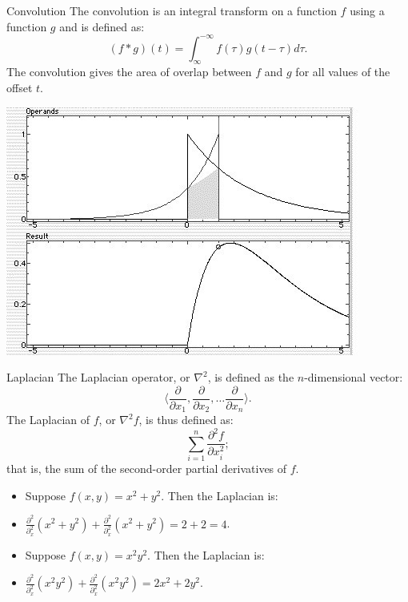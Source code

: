 \documentclass[xcolor=dvipsnames]{beamer}
\begin{document}
\begin{frame}[label=math-convolution]{Convolution}
 The convolution is an integral transform on a function $f$ using a function $g$ and is defined as:
 \begin{equation}
  (f*g)(t) = \int_{\infty}^{-\infty} f(\tau) g(t-\tau) d\tau.
 \end{equation}
 The convolution gives the area of overlap between $f$ and $g$ for all values of the offset $t$.
\end{frame}

\begin{frame}
\includegraphics[width=\textwidth]{imgs/convolution.jpg}
\end{frame}

\begin{frame}[label=math-laplacian]{Laplacian}
 The Laplacian operator, or $\nabla^2$, is defined as the $n$-dimensional vector:
 \begin{equation}
  \langle 
   \frac{\partial}{\partial x_1},
   \frac{\partial}{\partial x_2}, \ldots
   \frac{\partial}{\partial x_n}
  \rangle.
 \end{equation}
 The Laplacian of $f$, or $\nabla^2 f$, is thus defined as:
 \begin{equation}
  \sum_{i=1}^n \frac{\partial^2 f}{\partial x_i^2};
 \end{equation}
 that is, the sum of the second-order partial derivatives of $f$.
\end{frame}

\begin{frame}
 \begin{itemize} 
 \item Suppose $f(x,y) = x^2 + y^2$. Then the Laplacian is:
 \item $\frac{\partial^2}{\partial^2_x} 
       (x^2 + y^2) +
        \frac{\partial^2}{\partial^2_x} 
       (x^2 + y^2) = 2+ 2 = 4$.
 \vspace{16pt}  
 \item Suppose $f(x,y) = x^2y^2$. Then the Laplacian is:
 \item $\frac{\partial^2}{\partial^2_x} 
       (x^2y^2) +
        \frac{\partial^2}{\partial^2_x} 
       (x^2y^2) = 2x^2 + 2y^2$.
 \end{itemize} 
\end{frame}
\end{document}
